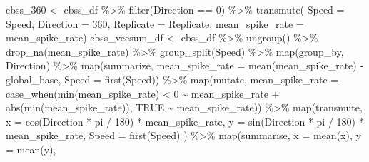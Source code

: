 \documentclass[
]{book}
\newenvironment{Shaded}{\begin{snugshade}}{\end{snugshade}}
\newcommand{\AttributeTok}[1]{\textcolor[rgb]{0.77,0.63,0.00}{#1}}
\newcommand{\ConstantTok}[1]{\textcolor[rgb]{0.00,0.00,0.00}{#1}}
\newcommand{\DecValTok}[1]{\textcolor[rgb]{0.00,0.00,0.81}{#1}}
\newcommand{\FunctionTok}[1]{\textcolor[rgb]{0.00,0.00,0.00}{#1}}
\newcommand{\NormalTok}[1]{#1}
\newcommand{\OtherTok}[1]{\textcolor[rgb]{0.56,0.35,0.01}{#1}}
\newcommand{\SpecialCharTok}[1]{\textcolor[rgb]{0.00,0.00,0.00}{#1}}
\begin{document}
\begin{Shaded}
\begin{Highlighting}[]
\NormalTok{cbss\_360 }\OtherTok{\textless{}{-}}
\NormalTok{  cbss\_df }\SpecialCharTok{\%\textgreater{}\%}
  \FunctionTok{filter}\NormalTok{(Direction }\SpecialCharTok{==} \DecValTok{0}\NormalTok{) }\SpecialCharTok{\%\textgreater{}\%}
  \FunctionTok{transmute}\NormalTok{(}
    \AttributeTok{Speed =}\NormalTok{ Speed,}
    \AttributeTok{Direction =} \DecValTok{360}\NormalTok{,}
    \AttributeTok{Replicate =}\NormalTok{ Replicate,}
    \AttributeTok{mean\_spike\_rate =}\NormalTok{ mean\_spike\_rate)}
\NormalTok{cbss\_vecsum\_df }\OtherTok{\textless{}{-}}
\NormalTok{  cbss\_df }\SpecialCharTok{\%\textgreater{}\%}
  \FunctionTok{ungroup}\NormalTok{() }\SpecialCharTok{\%\textgreater{}\%}
  \FunctionTok{drop\_na}\NormalTok{(mean\_spike\_rate) }\SpecialCharTok{\%\textgreater{}\%}
  \FunctionTok{group\_split}\NormalTok{(Speed) }\SpecialCharTok{\%\textgreater{}\%}
  \FunctionTok{map}\NormalTok{(group\_by, Direction) }\SpecialCharTok{\%\textgreater{}\%}
  \FunctionTok{map}\NormalTok{(summarize,}
      \AttributeTok{mean\_spike\_rate =} \FunctionTok{mean}\NormalTok{(mean\_spike\_rate) }\SpecialCharTok{{-}}\NormalTok{ global\_base,}
      \AttributeTok{Speed =} \FunctionTok{first}\NormalTok{(Speed)) }\SpecialCharTok{\%\textgreater{}\%}
  \FunctionTok{map}\NormalTok{(mutate,}
      \AttributeTok{mean\_spike\_rate =}
        \FunctionTok{case\_when}\NormalTok{(}\FunctionTok{min}\NormalTok{(mean\_spike\_rate) }\SpecialCharTok{\textless{}} \DecValTok{0} \SpecialCharTok{\textasciitilde{}}\NormalTok{ mean\_spike\_rate }\SpecialCharTok{+} \FunctionTok{abs}\NormalTok{(}\FunctionTok{min}\NormalTok{(mean\_spike\_rate)),}
                  \ConstantTok{TRUE} \SpecialCharTok{\textasciitilde{}}\NormalTok{ mean\_spike\_rate)) }\SpecialCharTok{\%\textgreater{}\%}
  \FunctionTok{map}\NormalTok{(transmute,}
      \AttributeTok{x =} \FunctionTok{cos}\NormalTok{(Direction }\SpecialCharTok{*}\NormalTok{ pi }\SpecialCharTok{/} \DecValTok{180}\NormalTok{) }\SpecialCharTok{*}\NormalTok{ mean\_spike\_rate,}
      \AttributeTok{y =} \FunctionTok{sin}\NormalTok{(Direction }\SpecialCharTok{*}\NormalTok{ pi }\SpecialCharTok{/} \DecValTok{180}\NormalTok{) }\SpecialCharTok{*}\NormalTok{ mean\_spike\_rate,}
      \AttributeTok{Speed =} \FunctionTok{first}\NormalTok{(Speed)}
\NormalTok{  ) }\SpecialCharTok{\%\textgreater{}\%}
  \FunctionTok{map}\NormalTok{(summarise,}
      \AttributeTok{x =} \FunctionTok{mean}\NormalTok{(x),}
      \AttributeTok{y =} \FunctionTok{mean}\NormalTok{(y),}

\end{Highlighting}
\end{Shaded}
\end{document}
